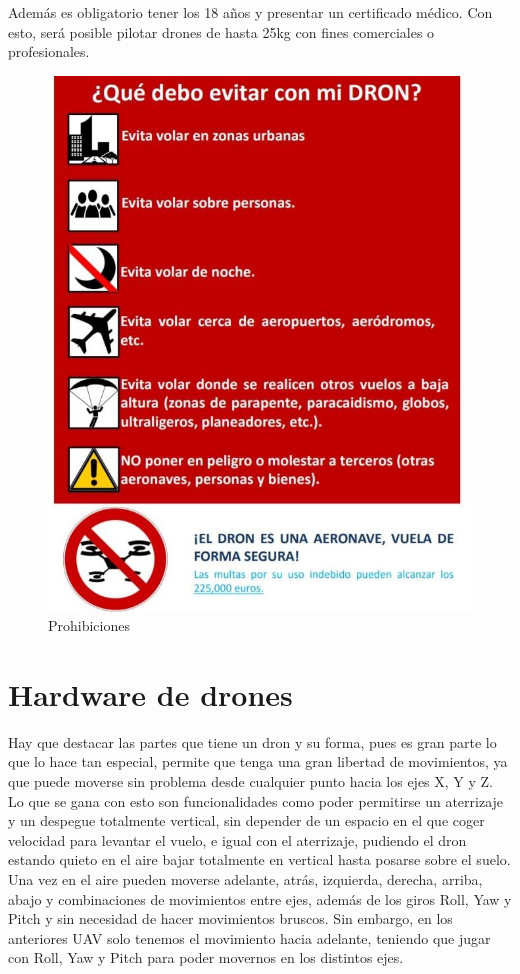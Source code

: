 Además es obligatorio tener los 18 años y presentar un certificado médico. Con esto, será posible pilotar drones de hasta 25kg con fines comerciales o profesionales.

\begin{figure}[H]
  \centering
  \includegraphics[scale=0.3]{imagenes/prohibiciones.jpg}
  \caption{Prohibiciones}
  \label{fig:prohibiciones}
\end{figure}


\section{Hardware de drones}

Hay que destacar las partes que tiene un dron y su forma, pues es gran parte
lo que lo hace tan especial, permite que tenga una gran libertad de movimientos, ya
que puede moverse sin problema desde cualquier punto hacia los ejes X, Y y Z. Lo
que se gana con esto son funcionalidades como poder permitirse un aterrizaje y un
despegue totalmente vertical, sin depender de un espacio en el que coger velocidad
para levantar el vuelo, e igual con el aterrizaje, pudiendo el dron estando quieto en
el aire bajar totalmente en vertical hasta posarse sobre el suelo. Una vez en el aire
pueden moverse adelante, atrás, izquierda, derecha, arriba, abajo y combinaciones de
movimientos entre ejes, además de los giros Roll, Yaw y Pitch y sin necesidad de hacer
movimientos bruscos. Sin embargo, en los anteriores UAV solo tenemos el movimiento
hacia adelante, teniendo que jugar con Roll, Yaw y Pitch para poder movernos en los
distintos ejes.

